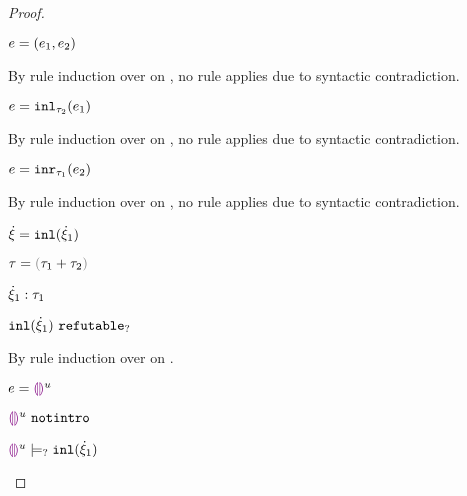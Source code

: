 \begin{proof}
\begin{byCases}
\begin{byCases}
\begin{pfsteps*}
      \item $e=(e_1 , e_2)$ 
      \end{pfsteps*} 
      By rule induction over  on , no rule applies due to syntactic contradiction.
      \item[\text{(\ref{rule:IInl})}] 
      \begin{pfsteps*}
      \item $e=\mathtt{inl}_{\tau_2}({e_1})$ 
      \end{pfsteps*} 
      By rule induction over  on , no rule applies due to syntactic contradiction.
      \item[\text{(\ref{rule:IInr})}] 
      \begin{pfsteps*}
      \item $e=\mathtt{inr}_{\tau_1}({e_2})$ 
      \end{pfsteps*} 
      By rule induction over  on , no rule applies due to syntactic contradiction.
    \end{byCases}
    \item[\text{(\ref{rule:CTInl})}]
    \begin{pfsteps*}
      \item $\dot{\xi} = \mathtt{inl}(\dot{\xi}_1)$ 
      \item $\tau = \tsum{\tau_1}{\tau_2}$ 
      \item $\dot{\xi}_1 : \tau_1$  
      \item $\mathtt{inl}(\dot{\xi}_1) ~\mathtt{refutable}_?$  
      \end{pfsteps*}
      By rule induction over  on .
      \begin{byCases}
        \item[\text{(\ref{rule:IEHole})}]
        \begin{pfsteps*}
        \item $e=\textcolor{violet}{\llparenthesis}\textcolor{violet}{\rrparenthesis}^{u}$ 
        \item $\textcolor{violet}{\llparenthesis}\textcolor{violet}{\rrparenthesis}^{u} ~\mathtt{notintro}$  
        \item $\textcolor{violet}{\llparenthesis}\textcolor{violet}{\rrparenthesis}^{u} \models_{?} \mathtt{inl}(\dot{\xi}_1)$  

\end{pfsteps*}
\end{byCases}
\end{byCases}
\end{proof}
